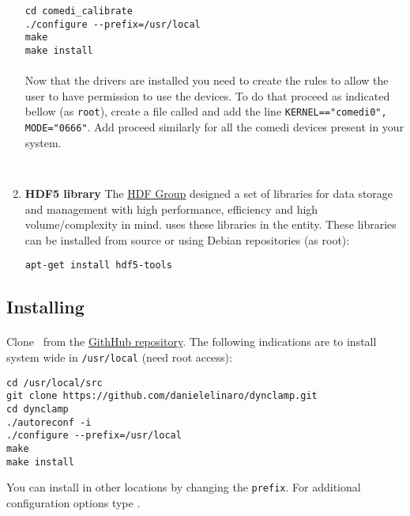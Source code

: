 \begin{enumerate}
\begin{lstlisting}
cd comedi_calibrate
./configure --prefix=/usr/local
make
make install
\end{lstlisting}

\paragraph{}
Now that the drivers are installed you need to create the rules to allow the user to have permission to use the devices. To do that proceed as indicated bellow (as \texttt{root}), create a file called  and add the line \texttt{KERNEL=="comedi0", MODE="0666"}. Add proceed similarly for all the comedi devices present in your system.

\begin{lstlisting}


\end{lstlisting}

\item \textbf{HDF5 library} 
The \href{http://www.hdfgroup.org/HDF5/}{HDF Group} designed a set of libraries for data storage and management with high performance, efficiency and high volume/complexity in mind. \textbf{\progname} uses these libraries in the  entity. These libraries can be installed from source or using Debian repositories (as root):
\begin{lstlisting}
apt-get install hdf5-tools
\end{lstlisting}


\end{enumerate}

\subsection{Installing \progname} 
\label{install:program}
\paragraph{}
Clone \progname\ from the \href{https://github.com/danielelinaro/dynclamp}{GithHub repository}. The following indications are to install system wide in \texttt{/usr/local} (need root access):
\begin{lstlisting}
cd /usr/local/src
git clone https://github.com/danielelinaro/dynclamp.git
cd dynclamp
./autoreconf -i
./configure --prefix=/usr/local
make
make install
\end{lstlisting}
You can install in other locations by changing the \texttt{prefix}.
For additional configuration options type .

